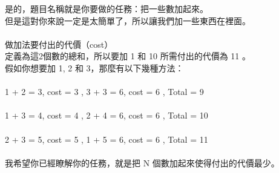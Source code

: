 是的，題目名稱就是你要做的任務：把一些數加起來。\\
但是這對你來說一定是太簡單了，所以讓我們加一些東西在裡面。\\
\\
做加法要付出的代價（cost）\\
定義為這2個數的總和，所以要加 1 和 10 所需付出的代價為 11 。\\
假如你想要加 1, 2 和 3，那麼有以下幾種方法：\\
\\
1 + 2 = 3, cost = 3 , 3 + 3 = 6, cost = 6  , Total = 9\\
\\
1 + 3 = 4, cost = 4 , 2 + 4 = 6, cost = 6  , Total = 10\\
\\
2 + 3 = 5, cost = 5 , 1 + 5 = 6, cost = 6  , Total = 11\\
\\
我希望你已經瞭解你的任務，就是把 N 個數加起來使得付出的代價最少。\\
